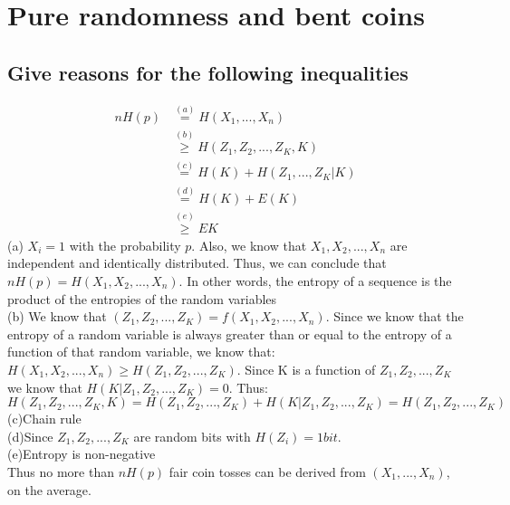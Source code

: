 \documentclass[11pt, oneside]{book}   	%
\begin{document}
\section{Pure randomness and bent coins}
\subsection{Give reasons for the following inequalities}
\begin{equation}
\begin{split}
 nH(p) & \overset{(a)}{=} H(X_1,...,X_n)\\
 & \overset{(b)}{\geq} H(Z_1, Z_2,...,Z_K,K)\\
 & \overset{(c)}{=} H(K) + H(Z_1,...,Z_K|K)\\
 & \overset{(d)}{=} H(K) + E(K)\\
 & \overset{(e)}{\geq} EK
\end{split}
\end{equation}
(a) $X_i=1$ with the probability $p$.  Also, we know that $X_1, X_2,...,X_n$ are independent and identically distributed.  Thus, we can conclude that $nH(p) = H(X_1,X_2,...,X_n)$.  In other words, the entropy of a sequence is the product of the entropies of the random variables\\
(b) We know that $(Z_1,Z_2,...,Z_K) = f(X_1, X_2,...,X_n)$.  Since we know that the entropy of a random variable is always greater than or equal to the entropy of a function of that random variable, we know that: $H(X_1,X_2,...,X_n) \geq H(Z_1,Z_2,...,Z_K)$.  Since K is a function of $Z_1,Z_2,...,Z_K$ we know that $H(K|Z_1,Z_2,...,Z_K) = 0$.  Thus:
$$H(Z_1,Z_2,...,Z_K,K) = H(Z_1,Z_2,...,Z_K) + H(K|Z_1,Z_2,...,Z_K) = H(Z_1,Z_2,...,Z_K)$$
(c)Chain rule\\
(d)Since $Z_1,Z_2,...,Z_K$ are random bits with $H(Z_i)=1bit$.\\
(e)Entropy is non-negative\\
Thus no more than $nH(p)$ fair coin tosses can be derived from $(X_1,...,X_n)$, on the average.
\end{document}
